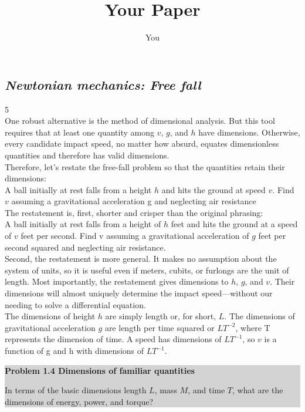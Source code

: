 \documentclass[a4paper]{article}
\title{Your Paper}
\author{You}
\begin{document}
\subsection{\textit{Newtonian mechanics: Free fall}}\hfill {5}\\

{\large One robust alternative is the method of dimensional analysis. But this
tool requires that at least one quantity among $v$, $g$, and $h$ have dimensions.
Otherwise, every candidate impact speed, no matter how absurd, equates
dimensionless quantities and therefore has valid dimensions.
\\

Therefore, let’s restate the free-fall problem so that the quantities retain
  their dimensions:}
\\

{\normalsize A ball initially at rest falls from a height $h$ and hits the ground at speed $v$.
Find $v$ assuming a gravitational acceleration g and neglecting air resistance} 
\\

{\large The restatement is, first, shorter and crisper than the original phrasing:}
\\

{\normalsize A ball initially at rest falls from a height of $h$ feet and hits the ground at a
speed of $v$ feet per second. Find v assuming a gravitational acceleration of $g$
feet per second squared and neglecting air resistance.}
\\

{\large Second, the restatement is more general. It makes no assumption about
the system of units, so it is useful even if meters, cubits, or furlongs are
the unit of length. Most importantly, the restatement gives dimensions to
$h$, $g$, and $v$. Their dimensions will almost uniquely determine the impact
speed—without our needing to solve a differential equation.
\\

The dimensions of height $h$ are simply length or, for short, $L$. The dimensions           
of gravitational acceleration $g$ are length per time squared or $LT^{−2}$,
where T represents the dimension of time. A speed has dimensions of
$LT^{−1}$, so $v$ is a function of g and h with dimensions of $LT^{−1}$.}
\\

\colorbox{lightgray}{
\begin{minipage}{\textwidth}
 {\normalsize\textbf{Problem 1.4 Dimensions of familiar quantities}

In terms of the basic dimensions length $L$, mass $M$, and time $T$, what are the
dimensions of energy, power, and torque?}
\end{minipage}
}
\\
\end{document}
